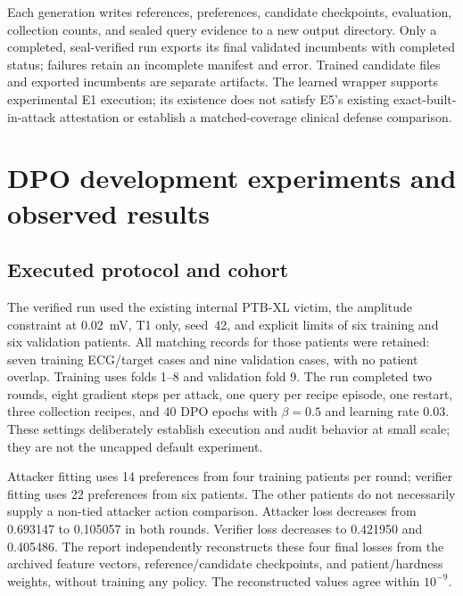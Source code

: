 Each generation writes references, preferences, candidate checkpoints, evaluation, collection counts, and sealed query evidence to a new output directory. Only a completed, seal-verified run exports its final validated incumbents with completed status; failures retain an incomplete manifest and error. Trained candidate files and exported incumbents are separate artifacts. The learned wrapper supports experimental E1 execution; its existence does not satisfy E5's existing exact-built-in-attack attestation or establish a matched-coverage clinical defense comparison.

\section{DPO development experiments and observed results}
\label{sec:dporesults}
\subsection{Executed protocol and cohort}
The verified run used the existing internal PTB-XL victim, the amplitude constraint at 0.02~mV, T1 only, seed~42, and explicit limits of six training and six validation patients. All matching records for those patients were retained: seven training ECG/target cases and nine validation cases, with no patient overlap. Training uses folds 1--8 and validation fold 9. The run completed two rounds, eight gradient steps per attack, one query per recipe episode, one restart, three collection recipes, and 40 DPO epochs with $\beta=0.5$ and learning rate 0.03. These settings deliberately establish execution and audit behavior at small scale; they are not the uncapped default experiment.

\begin{table}[htbp]\centering\scriptsize

\caption{Actual frozen-reference DPO fitting in the two-round development run. Preference accuracy is a training-pair statistic, not diagnostic accuracy or validation ASR. ``Best'' denotes the restored lowest patient-balanced training loss. No candidate was promoted.}
\label{tab:dpofit}\end{table}

Attacker fitting uses 14 preferences from four training patients per round; verifier fitting uses 22 preferences from six patients. The other patients do not necessarily supply a non-tied attacker action comparison. Attacker loss decreases from 0.693147 to 0.105057 in both rounds. Verifier loss decreases to 0.421950 and 0.405486. The report independently reconstructs these four final losses from the archived feature vectors, reference/candidate checkpoints, and patient/hardness weights, without training any policy. The reconstructed values agree within $10^{-9}$.

